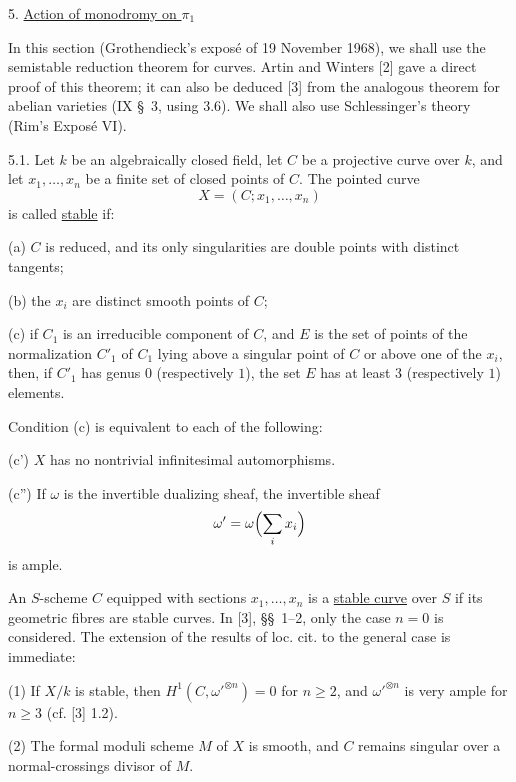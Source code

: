 
5. \underline{Action of monodromy on $\pi_1$}

In this section (Grothendieck's expos\'{e} of 19 November 1968), we
shall use the semistable reduction theorem for curves. Artin and Winters
[2] gave a direct proof of this theorem; it can also be deduced [3] from
the analogous theorem for abelian varieties (IX \S~3, using 3.6). We
shall also use Schlessinger's theory (Rim's Expos\'{e} VI).

5.1. Let $k$ be an algebraically closed field, let $C$ be a projective
curve over $k$, and let $x_1,\ldots,x_n$ be a finite set of closed points
of $C$. The pointed curve
\[
X=(C;x_1,\ldots,x_n)
\]
is called \underline{stable} if:

(a) $C$ is reduced, and its only singularities are double points with
distinct tangents;

(b) the $x_i$ are distinct smooth points of $C$;

(c) if $C_1$ is an irreducible component of $C$, and $E$ is the set of
points of the normalization $C'_1$ of $C_1$ lying above a singular point
of $C$ or above one of the $x_i$, then, if $C'_1$ has genus $0$
(respectively $1$), the set $E$ has at least $3$ (respectively $1$)
elements.

Condition (c) is equivalent to each of the following:

(c') $X$ has no nontrivial infinitesimal automorphisms.

(c'') If $\omega$ is the invertible dualizing sheaf, the invertible
sheaf
\[
\omega'=\omega\Bigl(\sum_i x_i\Bigr)
\]
is ample.

An $S$-scheme $C$ equipped with sections $x_1,\ldots,x_n$ is a
\underline{stable curve} over $S$ if its geometric fibres are stable
curves. In [3], \S\S~1--2, only the case $n=0$ is considered. The
extension of the results of loc. cit. to the general case is immediate:

(1) If $X/k$ is stable, then
$H^1(C,\omega'^{\otimes n})=0$ for $n\geqslant2$, and
$\omega'^{\otimes n}$ is very ample for $n\geqslant3$ (cf. [3] 1.2).

(2) The formal moduli scheme $M$ of $X$ is smooth, and $C$ remains
singular over a normal-crossings divisor of $M$.

